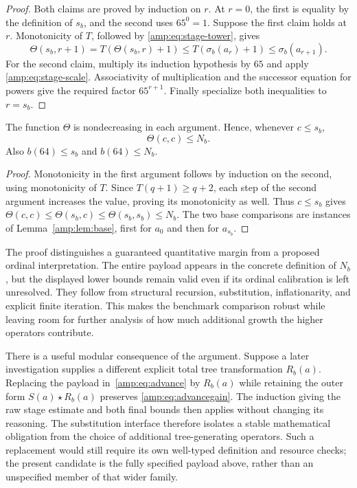 \begin{proof}
Both claims are proved by induction on $r$.  At $r=0$, the first is equality
by the definition of $s_b$, and the second uses $65^0=1$.  Suppose the first
claim holds at $r$.  Monotonicity of $T$, followed by
\eqref{amp:eq:stage-tower}, gives
\[
 \Theta(s_b,r+1)
 =T(\Theta(s_b,r)+1)
 \leq T(\sigma_b(a_r)+1)
 \leq\sigma_b(a_{r+1}).
\]
For the second claim, multiply its induction hypothesis by $65$ and apply
\eqref{amp:eq:stage-scale}.  Associativity of multiplication and the
successor equation for powers give the required factor $65^{r+1}$.
Finally specialize both inequalities to $r=s_b$.
\end{proof}

\begin{proposition}
\label{amp:prop:transfer}
The function $\Theta$ is nondecreasing in each argument.  Hence, whenever
$c\leq s_b$,
\[
 \Theta(c,c)\leq N_b.
\]
Also $b(64)\leq s_b$ and $b(64)\leq N_b$.
\end{proposition}

\begin{proof}
Monotonicity in the first argument follows by induction on the second,
using monotonicity of $T$.  Since $T(q+1)\geq q+2$, each step of the
second argument increases the value, proving its monotonicity as well.
Thus $c\leq s_b$ gives
$\Theta(c,c)\leq\Theta(s_b,c)\leq\Theta(s_b,s_b)\leq N_b$.
The two base comparisons are instances of Lemma~\ref{amp:lem:base}, first
for $a_0$ and then for $a_{s_b}$.
\end{proof}

The proof distinguishes a guaranteed quantitative margin from a proposed
ordinal interpretation.  The entire payload appears in the concrete
definition of $N_b$, but the displayed lower bounds remain valid even if
its ordinal calibration is left unresolved.  They follow from structural
recursion, substitution, inflationarity, and explicit finite iteration.
This makes the benchmark comparison robust while leaving room for further
analysis of how much additional growth the higher operators contribute.

There is a useful modular consequence of the argument.  Suppose a later
investigation supplies a different explicit total tree transformation
$R_b(a)$.  Replacing the payload in~\eqref{amp:eq:advance} by $R_b(a)$ while
retaining the outer form $S(a)\star R_b(a)$ preserves
\eqref{amp:eq:advancegain}.  The induction giving the raw stage estimate and
both final bounds then applies without changing its reasoning.  The
substitution interface therefore isolates a stable mathematical obligation
from the choice of additional tree-generating operators.  Such a replacement
would still require its own well-typed definition and resource checks; the
present candidate is the fully specified payload above, rather than an
unspecified member of that wider family.

